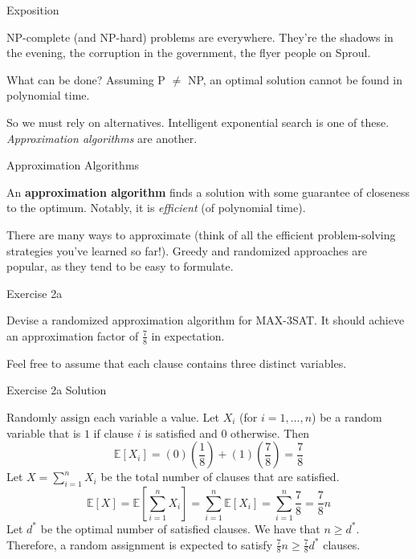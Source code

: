 \documentclass[10pt]{beamer}
\begin{document}
\begin{frame}[fragile]{Exposition}

NP-complete (and NP-hard) problems are everywhere. They're the shadows in the evening, the corruption in the government, the flyer people on Sproul.

What can be done? Assuming P $\neq$ NP, an optimal solution cannot be found in polynomial time.

So we must rely on alternatives. Intelligent exponential search is one of these. \textit{Approximation algorithms} are another.

\end{frame}

\begin{frame}[fragile]{Approximation Algorithms}

An \textbf{approximation algorithm} finds a solution with some guarantee of closeness to the optimum. Notably, it is \textit{efficient} (of polynomial time).

There are many ways to approximate (think of all the efficient problem-solving strategies you've learned so far!). Greedy and randomized approaches are popular, as they tend to be easy to formulate.

\end{frame}

\begin{frame}[fragile]{Exercise 2a}

Devise a randomized approximation algorithm for MAX-3SAT. It should achieve an approximation factor of $\frac{7}{8}$ in expectation.

Feel free to assume that each clause contains three distinct variables.

\end{frame}

\begin{frame}[fragile]{Exercise 2a {\color{red} Solution}}

{\color{red}
Randomly assign each variable a value. Let $X_i$ (for $i = 1, ..., n$) be a random variable that is $1$ if clause $i$ is satisfied and $0$ otherwise. Then
$$\mathbb{E}[X_i] = \left(0\right)\left(\frac{1}{8}\right) + \left(1\right)\left(\frac{7}{8}\right) = \frac{7}{8}$$
Let $X = \sum_{i = 1}^n X_i$ be the total number of clauses that are satisfied.
$$\mathbb{E}[X] = \mathbb{E}\left[\sum_{i = 1}^n X_i\right] = \sum_{i = 1}^n \mathbb{E}[X_i] = \sum_{i = 1}^n \frac{7}{8} = \frac{7}{8}n$$
Let $d^*$ be the optimal number of satisfied clauses. We have that $n \geq d^*$. Therefore, a random assignment is expected to satisfy $\frac{7}{8}n \geq \frac{7}{8}d^*$ clauses.
}

\end{frame}
\end{document}
